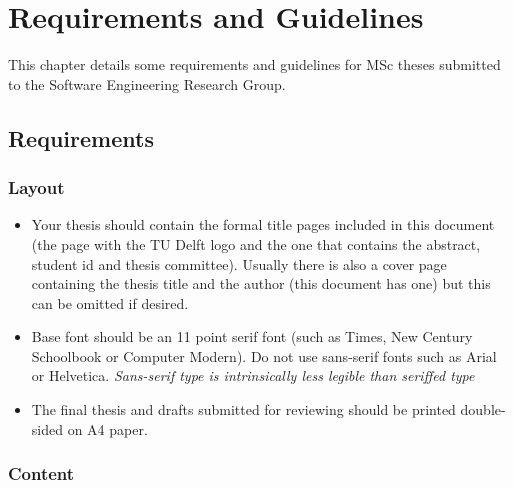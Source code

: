\chapter{Requirements and Guidelines}

This chapter details some requirements and guidelines for MSc theses
submitted to the Software Engineering Research Group.

\section{Requirements}

\subsection{Layout}

\begin{itemize}
\item Your thesis should contain the formal title pages included in
  this document (the page with the TU Delft logo and the one that
  contains the abstract, student id and thesis committee). Usually
  there is also a cover page containing the thesis title and the
  author (this document has one) but this can be omitted if desired.
 
\item Base font should be an 11 point serif font (such as Times, New
  Century Schoolbook or Computer Modern). Do not use sans-serif fonts
  such as Arial or Helvetica. \textsl{Sans-serif type is intrinsically
  less legible than seriffed type} %

\item The final thesis and drafts submitted for reviewing should be
printed double-sided on A4 paper.
\end{itemize}

\subsection{Content}

